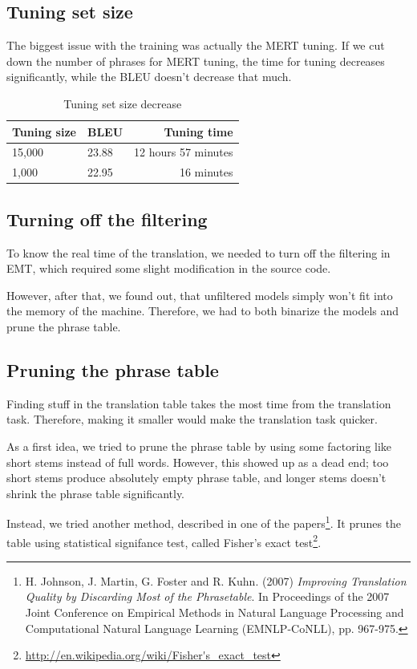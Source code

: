 \subsection{Tuning set size}
The biggest issue with the training was actually the MERT tuning. If we cut down the number of phrases for MERT tuning, the time for tuning decreases significantly, while the BLEU doesn't decrease that much.
\begin{table}[h]
\begin{center}
\begin{tabular}{|l|l|r|}
    \hline
    \textbf{Tuning size} & \textbf{BLEU} & \textbf{Tuning time} \\ \hline
    15,000 & 23.88 & 12 hours 57 minutes \\ \hline
    1,000 & 22.95 & 16 minutes \\  \hline
\end{tabular}
\end{center}

\caption{Tuning set size decrease}\label{moses:initialresults}
\end{table}

\subsection{Turning off the filtering}
To know the real time of the translation, we needed to turn off the filtering in EMT, which required some slight modification in the source code. 

However, after that, we found out, that unfiltered models simply won't fit into the memory of the machine. Therefore, we had to both binarize the models and prune the phrase table.

\subsection{Pruning the phrase table}
Finding stuff in the translation table takes the most time from the translation task. Therefore, making it smaller would make the translation task quicker.

As a first idea, we tried to prune the phrase table by using some factoring like short stems instead of full words. However, this showed up as a dead end; too short stems produce absolutely empty phrase table, and longer stems doesn't shrink the phrase table significantly.

Instead, we tried another method, described in one of the papers\footnote{H. Johnson, J. Martin, G. Foster and R. Kuhn. (2007) \emph{Improving Translation Quality by Discarding Most of the Phrasetable}. In Proceedings of the 2007 Joint Conference on Empirical Methods in Natural Language Processing and Computational Natural Language Learning (EMNLP-CoNLL), pp. 967-975.}. It prunes the table using statistical signifance test, called Fisher's exact test\footnote{\url{http://en.wikipedia.org/wiki/Fisher's_exact_test}}. 

